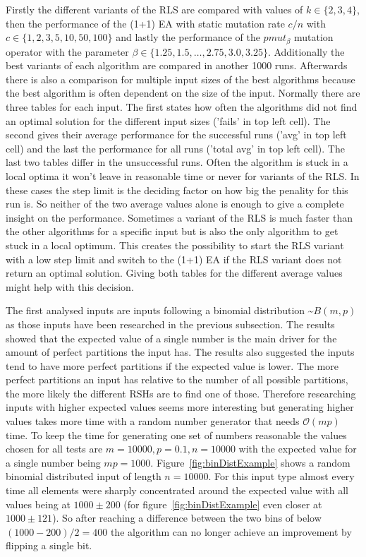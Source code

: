 Firstly the different variants of the RLS are compared with values of $k \in\{2,3,4\}$, then the performance of the (1+1) EA with static mutation rate $c/n$ with $c \in\{1,2,3,5,10,50,100\}$ and lastly the performance of the $pmut_\beta$ mutation operator with the parameter $\beta \in \{1.25, 1.5, \dots, 2.75,3.0,3.25\}$.
Additionally the best variants of each algorithm are compared in another 1000 runs.
Afterwards there is also a comparison for multiple input sizes of the best algorithms because the best algorithm is often dependent on the size of the input.
Normally there are three tables for each input.
The first states how often the algorithms did not find an optimal solution for the different input sizes ('fails' in top left cell).
The second gives their average performance for the successful runs ('avg' in top left cell) and the last the performance for all runs ('total avg' in top left cell).
The last two tables differ in the unsuccessful runs. Often the algorithm is stuck in a local optima it won't leave in reasonable time or never for variants of the RLS.
In these cases the step limit is the deciding factor on how big the penality for this run is.
So neither of the two average values alone is enough to give a complete insight on the performance.
Sometimes a variant of the RLS is much faster than the other algorithms for a specific input but is also the only algorithm to get stuck in a local optimum.
This creates the possibility to start the RLS variant with a low step limit and switch to the (1+1) EA if the RLS variant does not return an optimal solution.
Giving both tables for the different average values might help with this decision.

The first analysed inputs are inputs following a binomial distribution \textasciitilde$B(m,p)$ as those inputs have been researched in the previous subsection.
The results showed that the expected value of a single number is the main driver for the amount of perfect partitions the input has.
The results also suggested the inputs tend to have more perfect partitions if the expected value is lower.
The more perfect partitions an input has relative to the number of all possible partitions, the more likely the different RSHs are to find one of those.
Therefore researching inputs with higher expected values seems more interesting but generating higher values takes more time with a random number generator that needs $\mathcal{O}(mp)$ time.
To keep the time for generating one set of numbers reasonable the values chosen for all tests are $m=10000, p=0.1, n=10000$ with the expected value for a single number being $mp=1000$.
Figure~\ref{fig:binDistExample} shows a random binomial distributed input of length $n=10000$.
For this input type almost every time all elements were sharply concentrated around the expected value with all values being at $1000\pm200$ (for figure~\ref{fig:binDistExample} even closer at $1000\pm121$).
So after reaching a difference between the two bins of below $(1000-200)/2=400$ the algorithm can no longer achieve an improvement by flipping a single bit.

